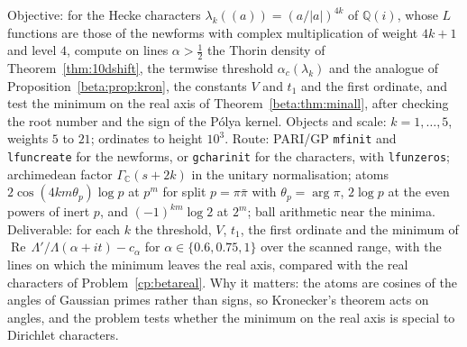 \begin{compproblem}\label{cp:betahecke}
Objective: for the Hecke characters \cite{hecke1918} $\lambda_k((a))=(a/|a|)^{4k}$ of $\mathbb Q(i)$, whose $L$ functions are those of the newforms with complex multiplication of weight $4k+1$ and level $4$, compute on lines $\alpha>\tfrac12$ the Thorin density of Theorem~\ref{thm:10dshift}, the termwise threshold $\alpha_c(\lambda_k)$ and the analogue of Proposition~\ref{beta:prop:kron}, the constants $V$ and $t_1$ and the first ordinate, and test the minimum on the real axis of Theorem~\ref{beta:thm:minall}, after checking the root number and the sign of the P\'olya kernel. Objects and scale: $k=1,\dots,5$, weights $5$ to $21$; ordinates to height $10^3$. Route: PARI/GP \texttt{mfinit} and \texttt{lfuncreate} for the newforms, or \texttt{gcharinit} for the characters, with \texttt{lfunzeros}; archimedean factor $\Gamma_{\mathbb C}(s+2k)$ in the unitary normalisation; atoms $2\cos(4km\theta_p)\log p$ at $p^m$ for split $p=\pi\bar\pi$ with $\theta_p=\arg\pi$, $2\log p$ at the even powers of inert $p$, and $(-1)^{km}\log2$ at $2^m$; ball arithmetic near the minima. Deliverable: for each $k$ the threshold, $V$, $t_1$, the first ordinate and the minimum of $\operatorname{Re}\,\Lambda'/\Lambda(\alpha+it)-c_\alpha$ for $\alpha\in\{0.6,0.75,1\}$ over the scanned range, with the lines on which the minimum leaves the real axis, compared with the real characters of Problem~\ref{cp:betareal}. Why it matters: the atoms are cosines of the angles of Gaussian primes rather than signs, so Kronecker's theorem acts on angles, and the problem tests whether the minimum on the real axis is special to Dirichlet characters.
\end{compproblem}

